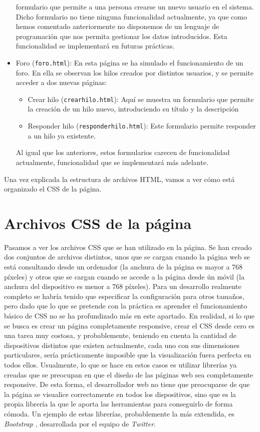 \documentclass[11pt]{article}
\theoremstyle{plain}
\theoremstyle{definition}
\begin{document}
\begin{itemize}
  formulario que permite a una persona crearse un nuevo usuario en el
  sistema. Dicho formulario no tiene ninguna funcionalidad
  actualmente, ya que como hemos comentado anteriormente no disponemos
  de un lenguaje de programación que nos permita gestionar los datos
  introducidos. Esta funcionalidad se implementará en futuras
  prácticas.
\item Foro (\texttt{foro.html}): En esta página se ha simulado el
  funcionamiento de un foro. En ella se observan los hilos creados por
  distintos usuarios, y se permite acceder a dos nuevas páginas:
  \begin{itemize}
  \item Crear hilo (\texttt{crearhilo.html}): Aquí se muestra un
    formulario que permite la creación de un hilo nuevo, introduciendo
    su título y la descripción
  \item Responder hilo (\texttt{responderhilo.html}): Este formulario
    permite responder a un hilo ya existente.
  \end{itemize}
  Al igual que los anteriores, estos formularios carecen de
  funcionalidad actualmente, funcionalidad que se implementará más
  adelante.
\end{itemize}

Una vez explicada la estructura de archivos HTML, vamos a ver cómo está
organizado el CSS de la página.

\section{Archivos CSS de la página}

Pasamos a ver los archivos CSS que se han utilizado en la página. Se
han creado dos conjuntos de archivos distintos, unos que se cargan
cuando la página web se está consultando desde un ordenador (la
anchura de la página es mayor a 768 píxeles) y otros que se cargan
cuando se accede a la página desde ún móvil (la anchura del
dispositivo es menor a 768 píxeles). Para un desarrollo realmente
completo se habría tenido que especificar la configuración para otros
tamaños, pero dado que lo que se pretende con la práctica es aprender
el funcionamiento básico de CSS no se ha profundizado más en este
apartado. En realidad, si lo que se busca es crear un página
completamente responsive, crear el CSS desde cero es una tarea muy
costosa, y probablemente, teniendo en cuenta la cantidad de
dispositivos distintos que existen actualmente, cada uno con sus
dimensiones particulares, sería prácticamente imposible que la
visualización fuera perfecta en todos ellos. Usualmente, lo que se
hace en estos casos es utilizar librerías ya creadas que se preocupan
en que el diseño de las páginas web sea completamente responsive. De
esta forma, el desarrollador web no tiene que preocuparse de que la
página se visualice correctamente en todos los dispositivos, sino que
es la propia librería la que le aporta las herramientas para
conseguirlo de forma cómoda. Un ejemplo de estas librerías,
probablemente la más extendida, es \textit{Bootstrap}
\cite{bootstrap}, desarrollada por el equipo de \textit{Twitter}.
\end{document}
